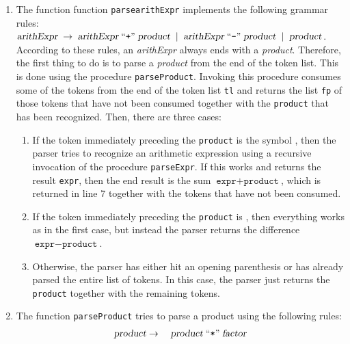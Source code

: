 \noindent
\begin{enumerate}
\item The function function \texttt{parsearithExpr} implements the following grammar rules:
      \\[0.2cm]
      \hspace*{1.3cm}
      $\textsl{arithExpr} \;\rightarrow\; \textsl{arithExpr} \;\mbox{``\texttt{+}''}\; \textsl{product} 
                          \;\mid\;        \textsl{arithExpr} \;\mbox{``\texttt{-}''}\; \textsl{product}  
                          \;\mid\;        \textsl{product}                           
      $.
      \\[0.2cm]
      According to these rules, an \textsl{arithExpr} always ends with a \textsl{product}.
      Therefore, the first thing to do is to parse a \textsl{product} from the end of the
      token list.  This is done using the procedure \texttt{parseProduct}.  Invoking this
      procedure consumes some of the tokens from the end of the token list \texttt{tl} and returns 
      the list \texttt{fp} of those tokens that have not been consumed together with the
      \texttt{product} that has been recognized.  Then, there are three cases:
      \begin{enumerate}
      \item If the token immediately preceding the \texttt{product} is the symbol
            \squoted{+}, then the parser tries to recognize an arithmetic expression
            using a recursive invocation of the procedure \texttt{parseExpr}.  If this
            works and returns the result \texttt{expr}, then the end result is the sum
            $\texttt{expr} + \texttt{product}$, which is returned in line 7 together with
            the tokens that have not been consumed.
      \item If the token immediately preceding the \texttt{product} is 
            \squoted{-}, then everything works as in the first case, but instead the 
            parser returns the difference $\texttt{expr} - \texttt{product}$.
      \item Otherwise, the parser has either hit an opening parenthesis or has already parsed the
            entire list of tokens.  In this case, the
            parser just returns the \texttt{product} together with the remaining tokens.
      \end{enumerate}      
\item The function \texttt{parseProduct} tries to parse a product using the following rules:
      \begin{eqnarray*}
        \textsl{product} & \rightarrow & \;\textsl{product} \quoted{*} \textsl{factor}\\

\end{eqnarray*}
\end{enumerate}
